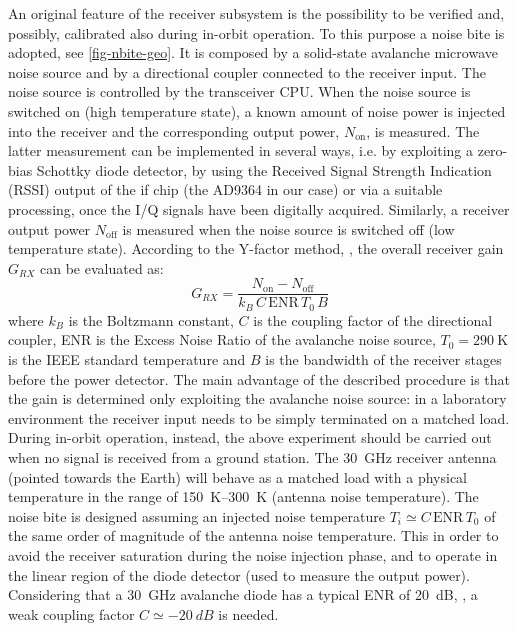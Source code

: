 \documentclass[conference,10pt,a4paper]{IEEEtran}%
\begin{document}
An original feature of the receiver subsystem is the possibility to be verified and, possibly, calibrated also during in-orbit operation.
To this purpose a noise \ac{bite} is adopted, see \cref{fig-nbite-geo}.
It is composed by a solid-state avalanche microwave noise source and by a directional coupler connected to the receiver input.
The noise source is controlled by the transceiver CPU.
When the noise source is switched on (high temperature state), a known amount of noise power is injected into the receiver and the corresponding output power, $N_\text{on}$, is measured.
The latter measurement can be implemented in several ways, i.e. by exploiting a zero-bias Schottky diode detector, by using the Received Signal Strength Indication (RSSI) output of the \ac{if} chip (the AD9364 in our case) or via a suitable processing, once the I/Q signals have been digitally acquired.
Similarly, a receiver output power $N_\text{off}$ is measured when the noise source is switched off (low temperature state).
According to the Y-factor method, \cite{agilent_AN57-1, Alimenti2008}, the overall receiver gain $G_{RX}$ can be evaluated as:
\begin{equation}
   G_{RX} = \frac{N_\text{on} - N_\text{off}}{k_{B}\,C\,\textrm{ENR}\,T_{0}\,B}
   \label{eqn_RX_gain}
\end{equation}
where $k_{B}$ is the Boltzmann constant, $C$ is the coupling factor of the directional coupler, ENR is the Excess Noise Ratio of the avalanche noise source, $T_{0}=\SI{290}{\kelvin}$ is the IEEE standard temperature and $B$ is the bandwidth of the receiver stages before the power detector.
The main advantage of the described procedure is that the gain is determined only exploiting the avalanche noise source: in a laboratory environment the receiver input needs to be simply terminated on a matched load.
During in-orbit operation, instead, the above experiment should be carried out when no signal is received from a ground station.
The \SI{30}{\GHz} receiver antenna (pointed towards the Earth) will behave as a matched load with a physical temperature in the range of \SIrange{150}{300}{\kelvin} (antenna noise temperature).
The noise \ac{bite} is designed assuming an injected noise temperature $T_i \simeq C\,\text{ENR}\,T_{0}$ of the same order of magnitude of the antenna noise temperature.
This in order to avoid the receiver saturation during the noise injection phase, and to operate in the linear region of the diode detector (used to measure the output power).
Considering that a \SI{30}{GHz} avalanche diode has a typical ENR of \SI{20}{dB}, \cite{noisecom_NC407B,Alimenti2016}, a weak coupling factor $C \simeq \SI{-20}{dB}$ is needed.
\end{document}
